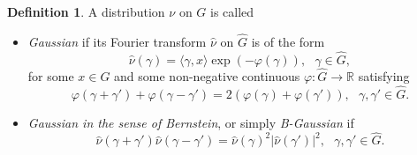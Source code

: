 \documentclass[12pt,reqno]{amsart}
\theoremstyle{definition}
\theoremstyle{definition}
\newtheorem{defn}[thm]{Definition}
\theoremstyle{definition}
\numberwithin{thm}{section}
\numberwithin{equation}{section}
\newcommand{\Real}{\mathbb R}
\newcommand{\la}{\langle}
\newcommand{\ra}{\rangle}
\begin{document}
\begin{defn} A distribution $\nu$ on $G$ is called
\begin{itemize}
    \item \textit{Gaussian} if its Fourier transform $\hat{\nu}$ on $\widehat{G}$ is of the form
    \begin{equation}\label{eq:x}\hat{\nu}(\gamma)=\la\gamma,x\ra \exp(-\varphi(\gamma)), \ \ \ \gamma\in \widehat{G},\end{equation}
    for some $x\in G$ and some non-negative continuous $\varphi: \widehat{G} \to \Real$ satisfying
    \begin{equation}\label{e:parallel}\varphi(\gamma+\gamma')+\varphi(\gamma -\gamma')=2(\varphi(\gamma)+\varphi(\gamma')), \ \ \ \gamma,\gamma'\in \widehat{G}.\end{equation}
    \item \textit{Gaussian in the sense of Bernstein}, or simply \textit{B-Gaussian} if
	\begin{equation}\label{e:BGauss}\hat{\nu}(\gamma +\gamma')\hat{\nu}(\gamma - \gamma') = \hat{\nu}(\gamma)^2|\hat{\nu}(\gamma')|^2, \ \ \ \gamma,\gamma' \in \widehat{G}.\end{equation}
\end{itemize}
\end{defn}  
\end{document}
